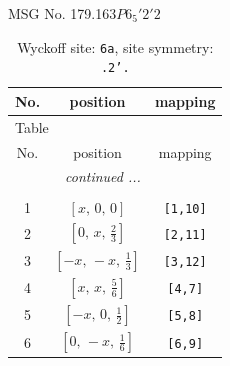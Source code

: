 \documentclass[fleqn,8pt]{jsarticle}
\begin{document}
\setcounter{MaxMatrixCols}{32}

\renewcommand{\tablename}{Table~}
\renewcommand{\figurename}{Figure~}
\begin{center}
\LARGE
MSG No. 179.163\quad$P6_{5}'2'2$
\end{center}
\renewcommand{\arraystretch}{1.2}
\begin{longtable}{ccc}
\caption{Wyckoff site: {\tt 6a}, site symmetry: {\tt .2'.}}
 \\
 \hline \hline
No. & position & mapping \\ \hline \endfirsthead

\multicolumn{2}{l}{\tablename\ \thetable{}} \\
 \hline \hline
No. & position & mapping \\ \hline \endhead

 \hline \hline
\multicolumn{2}{r}{\footnotesize\it continued ...} \\ \endfoot

 \hline \hline
\multicolumn{2}{r}{} \\ \endlastfoot

1 & $\left[ x,\, 0,\, 0 \right]$ & {\tt [1,10]} \\ \hline
2 & $\left[ 0,\, x,\, \frac{2}{3} \right]$ & {\tt [2,11]} \\ \hline
3 & $\left[ - x,\, - x,\, \frac{1}{3} \right]$ & {\tt [3,12]} \\ \hline
4 & $\left[ x,\, x,\, \frac{5}{6} \right]$ & {\tt [4,7]} \\ \hline
5 & $\left[ - x,\, 0,\, \frac{1}{2} \right]$ & {\tt [5,8]} \\ \hline
6 & $\left[ 0,\, - x,\, \frac{1}{6} \right]$ & {\tt [6,9]} \\
\end{longtable}
\renewcommand{\arraystretch}{1.2}
\end{document}
